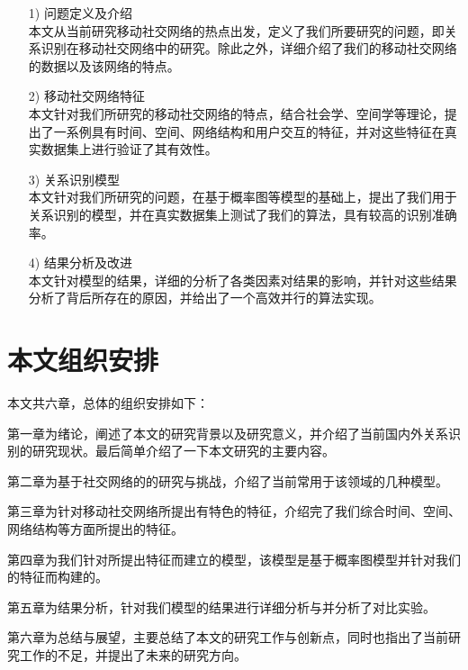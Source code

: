\begin{enumerate}
\item[1)]问题定义及介绍 \\
本文从当前研究移动社交网络的热点出发，定义了我们所要研究的问题，即关系识别在移动社交网络中的研究。除此之外，详细介绍了我们的移动社交网络的数据以及该网络的特点。

\item[2)] 移动社交网络特征 \\
本文针对我们所研究的移动社交网络的特点，结合社会学、空间学等理论，提出了一系例具有时间、空间、网络结构和用户交互的特征，并对这些特征在真实数据集上进行验证了其有效性。

\item[3)] 关系识别模型 \\
本文针对我们所研究的问题，在基于概率图等模型的基础上，提出了我们用于关系识别的模型，并在真实数据集上测试了我们的算法，具有较高的识别准确率。

\item[4)] 结果分析及改进 \\
本文针对模型的结果，详细的分析了各类因素对结果的影响，并针对这些结果分析了背后所存在的原因，并给出了一个高效并行的算法实现。
\end{enumerate}



\section{本文组织安排}

本文共六章，总体的组织安排如下：

第一章为绪论，阐述了本文的研究背景以及研究意义，并介绍了当前国内外关系识别的研究现状。最后简单介绍了一下本文研究的主要内容。

第二章为基于社交网络的的研究与挑战，介绍了当前常用于该领域的几种模型。

第三章为针对移动社交网络所提出有特色的特征，介绍完了我们综合时间、空间、网络结构等方面所提出的特征。

第四章为我们针对所提出特征而建立的模型，该模型是基于概率图模型并针对我们的特征而构建的。

第五章为结果分析，针对我们模型的结果进行详细分析与并分析了对比实验。

第六章为总结与展望，主要总结了本文的研究工作与创新点，同时也指出了当前研究工作的不足，并提出了未来的研究方向。











